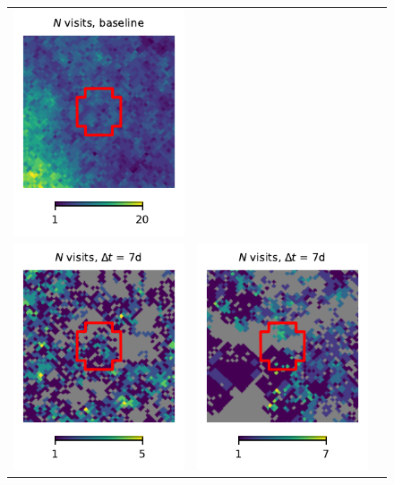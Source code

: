 \documentclass[preprintm,linenumbers]{aastex631}
\begin{document}
\begin{figure}
\begin{tabular}{c c c}
				\includegraphics{results/skymaps_cutout/skymaps_cutout_first_year_one_snap_v4_0_10yrs_db_noDD_noTwi_nside-256_CountMetric_g_GP_noDD_noTwi.pdf} \\
				\includegraphics{results/skymaps_cutout/skymaps_cutout_first_year_one_snap_v4_0_10yrs_db_noDD_noTwi_tscale-7_nside-256_doAllTemplateMetrics_reduceCount_g_NES_noDD_noTwi.pdf} &
				\includegraphics{results/skymaps_cutout/skymaps_cutout_first_year_one_snap_v4_0_10yrs_db_noDD_noTwi_tscale-7_nside-256_doAllTemplateMetrics_reduceCount_g_WFD_noDD_noTwi.pdf} &

\end{tabular}
\end{figure}
\end{document}
